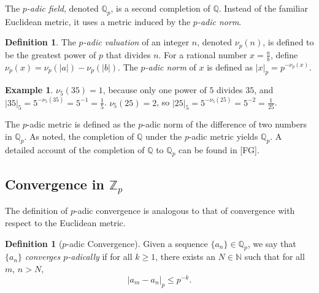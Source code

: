 \documentclass[12pt, letter]{article}    %
\theoremstyle{plain}
\theoremstyle{definition}
\newtheorem{example}[theorem]{Example}
\newtheorem{definition}[theorem]{Definition}
\numberwithin{equation}{section}
\newcommand{\rationals}{\mathbb{Q}}
\newcommand{\fcite}[1]{[#1]}
\begin{document}
The \textit{$p$-adic field}, denoted $\mathbb{Q}_p$, is a second completion of $\mathbb{Q}$. Instead of the familiar Euclidean metric, it uses a metric induced by the {\it $p$-adic norm}.

\begin{definition} The {\it $p$-adic valuation} of an integer $n$, denoted $\nu_p(n)$, is defined to be the greatest power of $p$ that divides $n$. For a rational number $x=\frac{a}{b}$, define $\nu_p(x)=\nu_p(|a|)-\nu_p(|b|)$. The {\it $p$-adic norm} of $x$ is defined as $|x|_p=p^{-\nu_p(x)}$.
\end{definition}

\begin{example}
$\nu_5(35)=1$, because only one power of $5$ divides $35$, and  $|35|_5=5^{-\nu_5(35)}=5^{-1}=\frac{1}{5}$. 
$\nu_5(25)=2$, so $|25|_5=5^{-\nu_5(25)}=5^{-2}=\frac{1}{25}$.
\end{example}
  

The $p$-adic metric is defined as the $p$-adic norm of the difference of two numbers in $\mathbb{Q}_p$. As noted, the completion of $\mathbb{Q}$ under the $p$-adic metric yields $\rationals_p$. A detailed account of the completion of $\rationals$ to $\rationals_p$ can be found in \fcite{FG}.


\subsection{Convergence in $\mathbb{Z}_p$}

The definition of $p$-adic convergence is analogous to that of convergence with respect to the Euclidean metric.

\begin{definition}[$p$-adic Convergence]
Given a sequence $\{a_n\}\in\rationals_p$, we say that $\{a_n\}$ \textit{converges $p$-adically} if for all $k\geq1$, there exists an $N\in\mathbb{N}$ such that for all $m$, $n>N,$
$$|a_m-a_n|_p\leq p^{-k}.$$
\end{definition}
\end{document}

